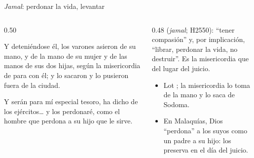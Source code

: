 \begin{frame}{\emph{Jamal}: perdonar la vida, levantar}
\begin{columns}[t,onlytextwidth]
\begin{column}{0.50\textwidth}
\begin{cita}Y deteniéndose él, los varones asieron de su mano, y de la mano de su mujer y de las manos de sus dos hijas, según la misericordia de \SENOR{} para con él; y lo sacaron y lo pusieron fuera de la ciudad.\end{cita}
\begin{center}\end{center}
\begin{cita}Y serán para mí especial tesoro, ha dicho \SENOR{} de los ejércitos\ldots{} y los perdonaré, como el hombre que perdona a su hijo que le sirve.\end{cita}
\begin{center}\end{center}
\end{column}
\begin{column}{0.48\textwidth}\scriptsize
{} (\emph{jamal}; H2550): ``tener compasión'' y, por implicación, ``librar, perdonar la vida, no destruir''. Es la misericordia que  del lugar del juicio.\par\medskip
\small
\begin{itemize}
\item Lot ; la misericordia lo toma de la mano y lo saca de Sodoma.
\item En Malaquías, Dios ``perdona'' a los suyos como un padre a su hijo: los preserva en el día del juicio.
\end{itemize}
\end{column}
\end{columns}
\end{frame}


